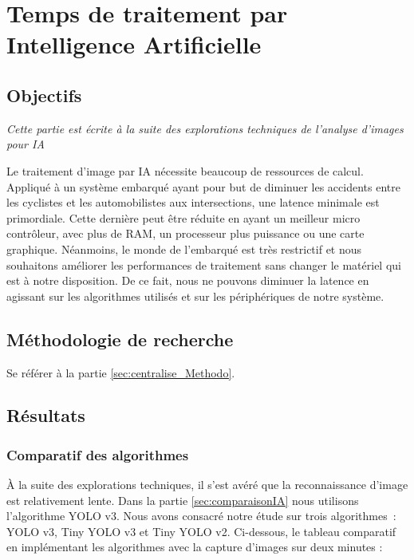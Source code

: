 \section{Temps de traitement par Intelligence Artificielle}
\label{sec:hwInference}

\subsection{Objectifs}
\label{sec:hwInference_Objectifs}

\textit{Cette partie est écrite à la suite des explorations techniques de l'analyse d'images pour \gls{IA}}

Le traitement d'image par \gls{IA} nécessite beaucoup de ressources de calcul. 
Appliqué à un système embarqué ayant pour but de diminuer les accidents entre les cyclistes et les automobilistes aux intersections, 
une latence minimale est primordiale.
Cette dernière peut être réduite en ayant un meilleur micro contrôleur, avec plus de \gls{RAM}, un processeur plus puissance ou une carte graphique. 
Néanmoins, le monde de l'embarqué est très restrictif et nous souhaitons améliorer les performances de traitement sans changer le matériel qui est à notre disposition.
De ce fait, nous ne pouvons diminuer la latence en agissant sur les algorithmes utilisés et sur les périphériques de notre système.

\subsection{Méthodologie de recherche}
\label{sec:hwInference_Methodo}

Se référer à la partie \ref{sec:centralise_Methodo}.

\subsection{Résultats}
\label{sec:hwInference_resultats}

\subsubsection{Comparatif des algorithmes}
\label{sec:hwInference_comp_algo}

À la suite des explorations techniques, il s'est avéré que la reconnaissance d'image est relativement lente. Dans la partie \ref{sec:comparaisonIA} nous utilisons l'algorithme YOLO v3.
Nous avons consacré notre étude sur trois algorithmes : YOLO v3, Tiny YOLO v3 et Tiny YOLO v2. Ci-dessous, le tableau comparatif en implémentant les algorithmes avec la capture d'images sur deux minutes :

